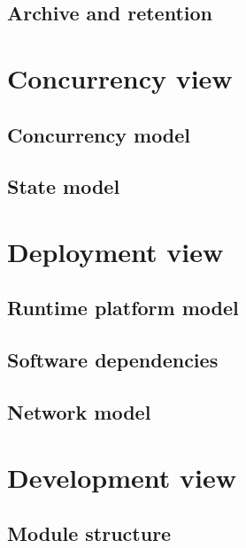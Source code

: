 \documentclass[a4paper,11pt]{report}
\begin{document}
\subsection{Archive and retention}
\label{sec:archive-retention}


\section{Concurrency view}
\label{sec:concurrency-view}


\subsection{Concurrency model}
\label{sec:concurrency-model}


\subsection{State model}
\label{sec:state-model}


\section{Deployment view}
\label{sec:deployment-view}


\subsection{Runtime platform model}
\label{sec:runt-platf-model}



\subsection{Software dependencies}
\label{sec:softw-depend}


\subsection{Network model}
\label{sec:network-model}


\section{Development view}
\label{sec:development-view}


\subsection{Module structure}
\label{sec:module-structure}
\end{document}
